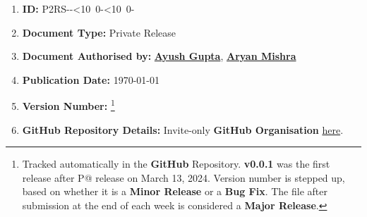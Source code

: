 \renewcommand{\thefootnote}{\alph{footnote}}
\def\mydate{\leavevmode\hbox{\the\year-\twodigits\month-\twodigits\day}}
\def\twodigits#1{\ifnum#1<10 0\fi\the#1}
\begin{enumerate}[itemsep = 0.1 pt]
\item{
\textbf{ID:} P2RS-\mydate-
}
      \item{
            \textbf{Document Type:} Private Release
            }

      \item{
            \textbf{Document Authorised by:} \textbf{\href{mailto:mt1210697@maths.iitd.ac.in}{Ayush Gupta}}, \href{mailto:ee1210137@ee.iitd.ac.in}{\textbf{Aryan Mishra}}}

      \item{
            \textbf{Publication Date:} \today
            }

      \item
            {
            \textbf{Version Number:} \footnote{Tracked automatically in the \textbf{GitHub} Repository.
                  \textbf{v0.0.1} was the first release after P@ release on March 13, 2024.
                  Version number is stepped up, based on whether it is a \textbf{Minor Release} or a \textbf{Bug Fix}.
                  The file after submission at the end of each week is considered a \textbf{Major Release}.}
            }

      \item{\textbf{GitHub Repository Details:} Invite-only \textbf{GitHub Organisation}
            \href{https://github.com/ELP305-Cleaning-Machine}{here}.
            }
\end{enumerate}
